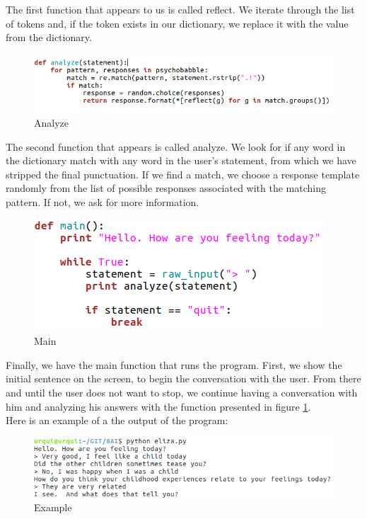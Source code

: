 \documentclass[12pt,twoside]{article}
\theoremstyle{plain}
\theoremstyle{definition}
\theoremstyle{remark}
\begin{document}
The first function that appears to us is called reflect. We iterate through the list of tokens and, if the token exists in our dictionary, we replace it with the value from the dictionary.

\begin{figure}[h]
\centering
\includegraphics[scale=0.6]{./Pictures/analyze.png}
\caption{Analyze}
\label{fig:analyze}
\end{figure}

The second function that appears is called analyze. We look for if any word in the dictionary match with any word in the user's statement, from which we have stripped the final punctuation. If we find a match, we choose a response template randomly from the list of possible responses associated with the matching pattern. If not, we ask for more information.
\begin{figure}[h]
\centering
\includegraphics[scale=0.6]{./Pictures/main.png}
\caption{Main}
\label{fig:main}

\end{figure}
Finally, we have the main function that runs the program. First, we show the initial sentence on the screen, to begin the conversation with the user. From there and until the user does not want to stop, we continue having a conversation with him and analyzing his answers with the function presented in figure \ref{fig:analyze}.\\

Here is an example of a the output of the program:



\begin{figure}[h]
\centering
\includegraphics[scale=0.6]{./Pictures/example.png}
\caption{Example}
\end{figure}
\end{document}
